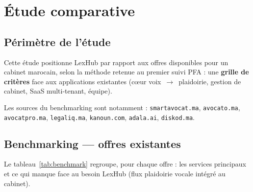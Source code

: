 \chapter{Étude comparative}
\label{ch:etat-art}

\section{Périmètre de l'étude}

Cette étude positionne LexHub par rapport aux offres disponibles pour un cabinet marocain, selon la méthode retenue au premier suivi PFA : une \textbf{grille de critères} face aux applications existantes (cœur voix~$\rightarrow$~plaidoirie, gestion de cabinet, SaaS multi-tenant, équipe).

Les sources du benchmarking sont notamment : \texttt{smartavocat.ma}, \texttt{avocato.ma}, \texttt{avocatpro.ma}, \texttt{legaliq.ma}, \texttt{kanoun.com}, \texttt{adala.ai}, \texttt{diskod.ma}.

\section{Benchmarking --- offres existantes}
\label{sec:benchmark}

Le tableau~\ref{tab:benchmark} regroupe, pour chaque offre : les services principaux et ce qui manque face au besoin LexHub (flux plaidoirie vocale intégré au cabinet).

